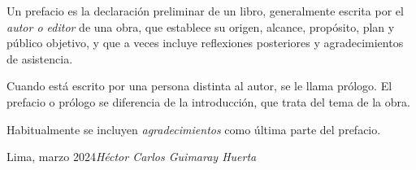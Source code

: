 \preface

Un prefacio es la declaración preliminar de un libro,
generalmente escrita por el \textit{autor o editor} de una obra, que
establece su origen, alcance, propósito, plan y público objetivo, y
que a veces incluye reflexiones posteriores y agradecimientos de
asistencia.

Cuando está escrito por una persona distinta al autor, se le llama
prólogo.
El prefacio o prólogo se diferencia de la introducción, que trata del
tema de la obra.

Habitualmente se incluyen \textit{agradecimientos} como última parte
del prefacio.

\vspace{\baselineskip}
\begin{flushright}\noindent
	Lima, marzo 2024\hfill {\it Héctor Carlos Guimaray Huerta}
\end{flushright}
